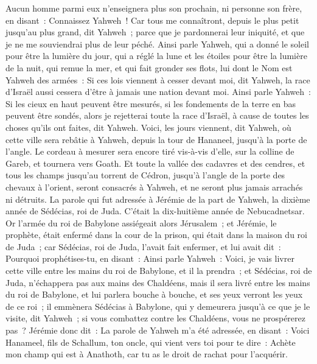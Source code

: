 \begin{multicols}{2}
Aucun homme parmi eux n'enseignera plus son prochain, ni personne son frère, en disant~: Connaissez Yahweh~! Car tous me connaîtront, depuis le plus petit jusqu'au plus grand, dit Yahweh~; parce que je pardonnerai leur iniquité, et que je ne me souviendrai plus de leur péché.
Ainsi parle Yahweh, qui a donné le soleil pour être la lumière du jour, qui a réglé la lune et les étoiles pour être la lumière de la nuit, qui remue la mer, et qui fait gronder ses flots, lui dont le Nom est Yahweh des armées~:
Si ces lois viennent à cesser devant moi, dit Yahweh, la race d'Israël aussi cessera d'être à jamais une nation devant moi.
Ainsi parle Yahweh~: Si les cieux en haut peuvent être mesurés, si les fondements de la terre en bas peuvent être sondés, alors je rejetterai toute la race d'Israël, à cause de toutes les choses qu'ils ont faites, dit Yahweh.
Voici, les jours viennent, dit Yahweh, où cette ville sera rebâtie à Yahweh, depuis la tour de Hananeel, jusqu'à la porte de l'angle.
Le cordeau à mesurer sera encore tiré vis-à-vis d'elle, sur la colline de Gareb, et tournera vers Goath.
Et toute la vallée des cadavres et des cendres, et tous les champs jusqu'au torrent de Cédron, jusqu'à l'angle de la porte des chevaux à l'orient, seront consacrés à Yahweh, et ne seront plus jamais arrachés ni détruits.
\VerseOne{}La parole qui fut adressée à Jérémie de la part de Yahweh, la dixième année de Sédécias, roi de Juda. C'était la dix-huitième année de Nebucadnetsar.
Or l'armée du roi de Babylone assiégeait alors Jérusalem~; et Jérémie, le prophète, était enfermé dans la cour de la prison, qui était dans la maison du roi de Juda~;
car Sédécias, roi de Juda, l'avait fait enfermer, et lui avait dit~: Pourquoi prophétises-tu, en disant~: Ainsi parle Yahweh~: Voici, je vais livrer cette ville entre les mains du roi de Babylone, et il la prendra~;
et Sédécias, roi de Juda, n'échappera pas aux mains des Chaldéens, mais il sera livré entre les mains du roi de Babylone, et lui parlera bouche à bouche, et ses yeux verront les yeux de ce roi~;
il emmènera Sédécias à Babylone, qui y demeurera jusqu'à ce que je le visite, dit Yahweh~; si vous combattez contre les Chaldéens, vous ne prospérerez pas~?
Jérémie donc dit~: La parole de Yahweh m'a été adressée, en disant~:
Voici Hanameel, fils de Schallum, ton oncle, qui vient vers toi pour te dire~: Achète mon champ qui est à Anathoth, car tu as le droit de rachat pour l'acquérir.

\end{multicols}
